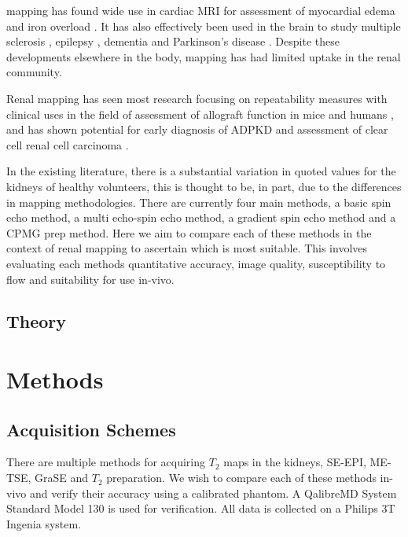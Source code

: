 \ttwo mapping has found wide use in cardiac \ac{MRI} for assessment of myocardial edema \cite{gouya_rapidly_2008, giri_t2_2009, nasenstein_cardiac_2014} and iron overload \cite{guo_myocardial_2009, krittayaphong_detection_2017}. It has also effectively been used in the brain to study multiple sclerosis \cite{neema_t1-_2007}, epilepsy \cite{rugg-gunn_whole-brain_2005}, dementia \cite{knight_quantitative_2016} and Parkinson’s disease \cite{vymazal_t1_1999}. Despite these developments elsewhere in the body, \ttwo mapping has had limited uptake in the renal community.

Renal \ttwo mapping has seen most research focusing on repeatability measures \cite{de_bazelaire_mr_2004, zhang_reproducibility_2011, li_measuring_2015, de_boer_multiparametric_2020} with clinical uses in the field of assessment of allograft function in mice \cite{hueper_kidney_2016} and humans \cite{mathys_t2_2011, adams_multiparametric_2020}, and has shown potential for early diagnosis of \ac{ADPKD} \cite{franke_magnetic_2017} and assessment of clear cell renal cell carcinoma \cite{adams_use_2019}.

In the existing literature, there is a substantial variation in quoted \ttwo values for the kidneys of healthy volunteers, this is thought to be, in part, due to the differences in \ttwo mapping methodologies. There are currently four main methods, a basic spin echo method, a multi echo-spin echo method, a gradient spin echo method and a \ac{CPMG} \ttwo prep method. Here we aim to compare each of these methods in the context of renal \ttwo mapping to ascertain which is most suitable. This involves evaluating each methods quantitative accuracy, image quality, susceptibility to flow and suitability for use in-vivo.

\subsection{Theory}


\section{Methods}
\label{sec:t2_methods}

\subsection{Acquisition Schemes}
\label{subsec:t2_acq_schemes}
There are multiple methods for acquiring $T_2$ maps in the kidneys, \ac{SE}-\ac{EPI}, \ac{ME-TSE}, \ac{GraSE} and $T_2$ preparation. We wish to compare each of these methods in-vivo and verify their accuracy using a calibrated phantom. A QalibreMD System Standard Model 130 \cite{noauthor_system_nodate} is used for verification. All data is collected on a Philips 3T Ingenia system. 

